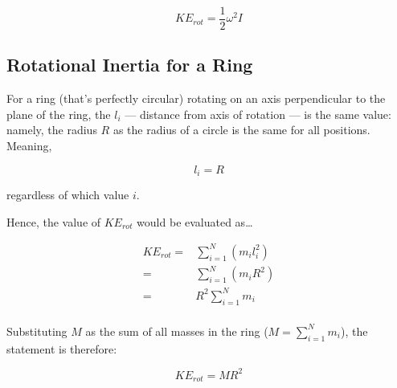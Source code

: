 \documentclass[letterpaper]{article}
\begin{document}
\begin{equation}
    KE_{rot} = \frac{1}{2}\omega^2I
\end{equation}


\subsection{Rotational Inertia for a Ring}
\label{sec:orgeba5487}
For a ring (that's perfectly circular) rotating on an axis perpendicular to the plane of the ring, the \(l_i\) --- distance from axis of rotation --- is the same value: namely, the radius \(R\) as the radius of a circle is the same for all positions. Meaning,

\begin{equation}
    l_i = R
\end{equation}

regardless of which value \(i\).

Hence, the value of \(KE_{rot}\) would be evaluated as\ldots{}

\begin{align}
    KE_{rot} =& \sum^N_{i=1}(m_il^2_i) \\
    =& \sum^N_{i=1}(m_iR^2) \\
    =& R^2 \sum^N_{i=1}m_i \\
\end{align}

Substituting \(M\) as the sum of all masses in the ring (\(M=\sum^N_{i=1}m_i\)), the statement is therefore:

\begin{equation}
    KE_{rot} = MR^2
\end{equation}
\end{document}
